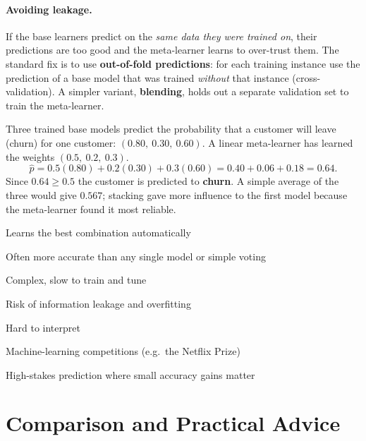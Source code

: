 \paragraph{Avoiding leakage.} If the base learners predict on the \emph{same data they were trained on}, their predictions are too good and the meta-learner learns to over-trust them. The standard fix is to use \textbf{out-of-fold predictions}: for each training instance use the prediction of a base model that was trained \emph{without} that instance (cross-validation). A simpler variant, \textbf{blending}, holds out a separate validation set to train the meta-learner.

\begin{example}
Three trained base models predict the probability that a customer will leave (churn) for one customer: $(0.80,\ 0.30,\ 0.60)$. A linear meta-learner has learned the weights $(0.5,\ 0.2,\ 0.3)$.
\[
  \hat p=0.5(0.80)+0.2(0.30)+0.3(0.60)=0.40+0.06+0.18=\mathbf{0.64}.
\]
Since $0.64\ge0.5$ the customer is predicted to \textbf{churn}. A simple average of the three would give $0.567$; stacking gave more influence to the first model because the meta-learner found it most reliable.
\end{example}


{\item Learns the best combination automatically
 \item Often more accurate than any single model or simple voting}
{\item Complex, slow to train and tune
 \item Risk of information leakage and overfitting
 \item Hard to interpret}
{\item Machine-learning competitions (e.g.\ the Netflix Prize)
 \item High-stakes prediction where small accuracy gains matter}

\section{Comparison and Practical Advice}

